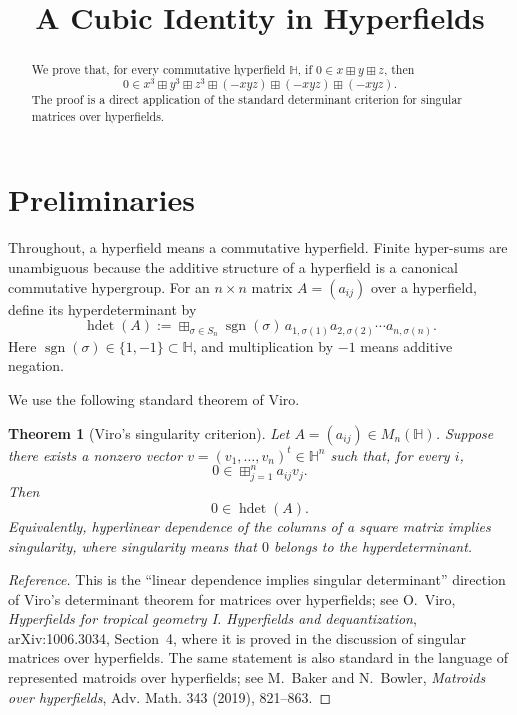 \documentclass[11pt]{article}
\newcommand{\bplus}{\boxplus}
\newcommand{\bigbplus}{\mathop{\boxplus}}
\DeclareMathOperator{\hdet}{hdet}
\newtheorem{theorem}{Theorem}
\begin{document}
\title{A Cubic Identity in Hyperfields}
\author{}
\date{}
\maketitle

\begin{abstract}
We prove that, for every commutative hyperfield $\mathbb H$, if
$0\in x\bplus y\bplus z$, then
\[
0\in x^3\bplus y^3\bplus z^3\bplus (-xyz)\bplus (-xyz)\bplus (-xyz).
\]
The proof is a direct application of the standard determinant criterion for
singular matrices over hyperfields.
\end{abstract}

\section*{Preliminaries}

Throughout, a hyperfield means a commutative hyperfield. Finite hyper-sums are
unambiguous because the additive structure of a hyperfield is a canonical
commutative hypergroup. For an $n\times n$ matrix $A=(a_{ij})$ over a hyperfield,
define its hyperdeterminant by
\[
\hdet(A)
 :=
 \bigbplus_{\sigma\in S_n}
 \operatorname{sgn}(\sigma)\,
 a_{1,\sigma(1)}a_{2,\sigma(2)}\cdots a_{n,\sigma(n)}.
\]
Here $\operatorname{sgn}(\sigma)\in\{1,-1\}\subset \mathbb H$, and multiplication
by $-1$ means additive negation.

We use the following standard theorem of Viro.

\begin{theorem}[Viro's singularity criterion]\label{thm:viro}
Let $A=(a_{ij})\in M_n(\mathbb H)$. Suppose there exists a nonzero vector
$v=(v_1,\dots,v_n)^t\in \mathbb H^n$ such that, for every $i$,
\[
0\in \bigbplus_{j=1}^n a_{ij}v_j.
\]
Then
\[
0\in \hdet(A).
\]
Equivalently, hyperlinear dependence of the columns of a square matrix implies
singularity, where singularity means that $0$ belongs to the hyperdeterminant.
\end{theorem}

\begin{proof}[Reference]
This is the ``linear dependence implies singular determinant'' direction of
Viro's determinant theorem for matrices over hyperfields; see O.~Viro,
\emph{Hyperfields for tropical geometry I. Hyperfields and dequantization},
arXiv:1006.3034, Section~4, where it is proved in the discussion of singular
matrices over hyperfields. The same statement is also standard in the language
of represented matroids over hyperfields; see M.~Baker and N.~Bowler,
\emph{Matroids over hyperfields}, Adv. Math. 343 (2019), 821--863.
\end{proof}
\end{document}
